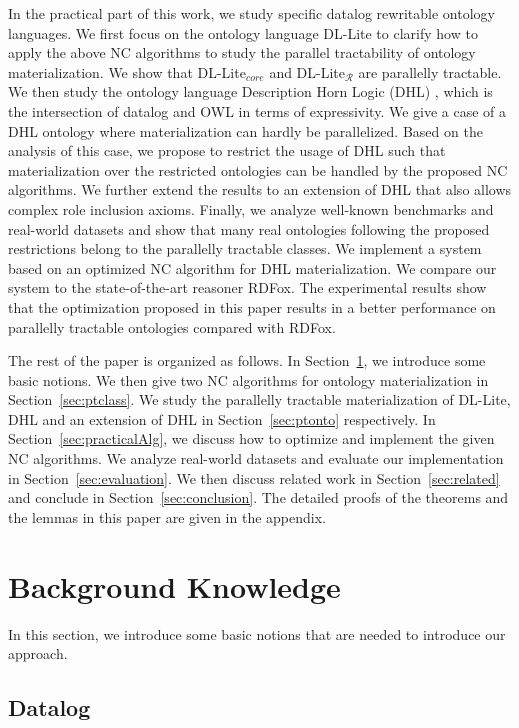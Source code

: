 \documentclass[final,1p,times]{elsarticle}
\begin{document}
In the practical part of this work, we study specific datalog rewritable ontology languages.
We first focus on the ontology language DL-Lite to clarify how to apply the above NC algorithms
to study the parallel tractability of ontology materialization.
We show that DL-Lite$_{core}$ and DL-Lite$_\mathcal{R}$ are parallelly tractable.
We then study the ontology language Description Horn Logic (DHL) \cite{GrosofHVD03}, which is the intersection of datalog and OWL
in terms of expressivity. We give a case of a DHL ontology where materialization can hardly be parallelized.
Based on the analysis of this case, we propose to restrict the usage of DHL such that materialization over the
restricted ontologies can be handled by the proposed NC algorithms.
We further extend the results to an extension of DHL that also allows complex role inclusion axioms.
Finally, we analyze well-known benchmarks and real-world datasets and show that many real ontologies following the
proposed restrictions belong to the parallelly tractable classes.
We implement a system based on an optimized NC algorithm for DHL materialization.
We compare our system to the state-of-the-art reasoner RDFox.
The experimental results show that the optimization proposed in this paper results in a better performance on parallelly
tractable ontologies compared with RDFox.

The rest of the paper is organized as follows. In Section~\ref{sec:background}, we introduce some basic notions.
We then give two NC algorithms for ontology materialization in Section~\ref{sec:ptclass}.
We study the parallelly tractable materialization of DL-Lite, DHL and an extension of DHL in Section~\ref{sec:ptonto} respectively.
In Section~\ref{sec:practicalAlg},
we discuss how to optimize and implement the given NC algorithms.
We analyze real-world datasets and evaluate our implementation in Section~\ref{sec:evaluation}.
We then discuss related work in Section~\ref{sec:related} and conclude in Section~\ref{sec:conclusion}.
The detailed proofs of the theorems and the lemmas in this paper are given in the appendix.


\section{Background Knowledge}
\label{sec:background}

In this section, we introduce some basic notions that are needed to introduce our approach.


\subsection{Datalog}
\end{document}
